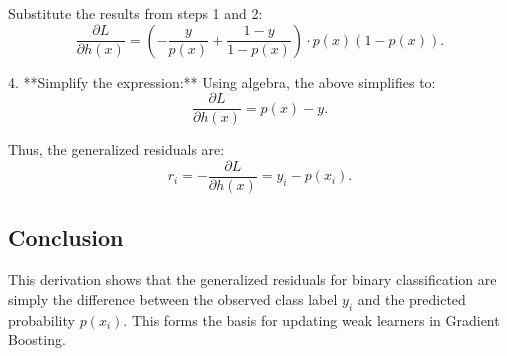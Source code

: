 \documentclass[12pt]{article}
\begin{document}
Substitute the results from steps 1 and 2:
\[
\frac{\partial L}{\partial h(x)} = \left(-\frac{y}{p(x)} + \frac{1-y}{1-p(x)}\right) \cdot p(x)(1-p(x)).
\]

4. **Simplify the expression:**
   Using algebra, the above simplifies to:
   \[
   \frac{\partial L}{\partial h(x)} = p(x) - y.
   \]

Thus, the generalized residuals are:
\[
r_i = -\frac{\partial L}{\partial h(x)} = y_i - p(x_i).
\]

\subsection*{Conclusion}
This derivation shows that the generalized residuals for binary classification are simply the difference between the observed class label \( y_i \) and the predicted probability \( p(x_i) \). This forms the basis for updating weak learners in Gradient Boosting.
\end{document}
